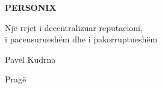 \thispagestyle{empty}
\begin{center}
  {\sffamily\bfseries\fontsize{34}{40}\selectfont PERSONIX\par}
  \vspace{2.2em}
  {\rmfamily\large Një rrjet i decentralizuar reputacioni,\\[0.25em]
   i pacensurueshëm dhe i pakorruptueshëm\par}
\end{center}
\begin{center}
  {\rmfamily\Large Pavel Kudrna\par}
  \vspace{0.45em}
  {\rmfamily\small Pragë\quad\textbullet{}\par}
\end{center}
\clearpage
